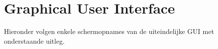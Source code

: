 \documentclass[11pt,a4paper]{article}
\begin{document}
	
	
	
\section{Graphical User Interface}
\label{sec:GUIpics}
	Hieronder volgen enkele schermopnames van de uiteindelijke GUI met onderstaande uitleg.  \\ \newline
	\hspace*{-5pt}
\end{document}
